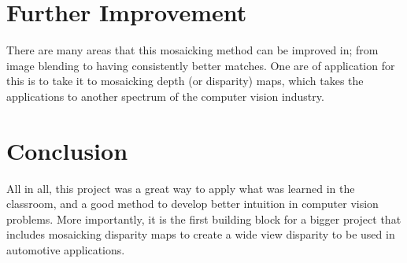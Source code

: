 \documentclass[10pt,twocolumn,letterpaper]{article}
\begin{document}
\section{Further Improvement}
There are many areas that this mosaicking method can be improved in; from image blending to having consistently better matches. One are of application for this is to take it to mosaicking depth (or disparity) maps, which takes the applications to another spectrum of the computer vision industry.
\section{Conclusion}
All in all, this project was a great way to apply what was learned in the classroom, and a good method to develop better intuition in computer vision problems. More importantly, it is the first building block for a bigger project that includes mosaicking disparity maps to create a wide view disparity to be used in automotive applications.
%


{\small


}
\end{document}
